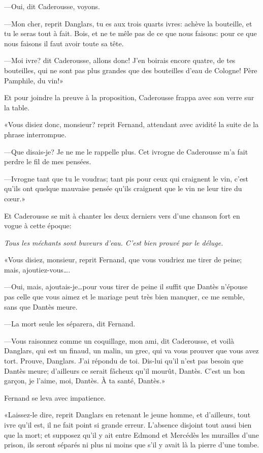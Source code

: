 —Oui, dit Caderousse, voyons.

—Mon cher, reprit Danglars, tu es aux trois quarts ivres: achève la bouteille, et tu le seras tout à fait. Bois, et ne te mêle pas de ce que nous faisons: pour ce que nous faisons il faut avoir toute sa tête.

—Moi ivre? dit Caderousse, allons donc! J'en boirais encore quatre, de tes bouteilles, qui ne sont pas plus grandes que des bouteilles d'eau de Cologne! Père Pamphile, du vin!»

Et pour joindre la preuve à la proposition, Caderousse frappa avec son verre sur la table.

«Vous disiez donc, monsieur? reprit Fernand, attendant avec avidité la suite de la phrase interrompue.

—Que disais-je? Je ne me le rappelle plus. Cet ivrogne de Caderousse m'a fait perdre le fil de mes pensées.

—Ivrogne tant que tu le voudras; tant pis pour ceux qui craignent le vin, c'est qu'ils ont quelque mauvaise pensée qu'ils craignent que le vin ne leur tire du cœur.»

Et Caderousse se mit à chanter les deux derniers vers d'une chanson fort en vogue à cette époque:

\textit{Tous les méchants sont buveurs d'eau. C'est bien prouvé par le déluge.}

«Vous disiez, monsieur, reprit Fernand, que vous voudriez me tirer de peine; mais, ajoutiez-vous\dots.

—Oui, mais, ajoutais-je\dots pour vous tirer de peine il suffit que Dantès n'épouse pas celle que vous aimez et le mariage peut très bien manquer, ce me semble, sans que Dantès meure.

—La mort seule les séparera, dit Fernand.

—Vous raisonnez comme un coquillage, mon ami, dit Caderousse, et voilà Danglars, qui est un finaud, un malin, un grec, qui va vous prouver que vous avez tort. Prouve, Danglars. J'ai répondu de toi. Dis-lui qu'il n'est pas besoin que Dantès meure; d'ailleurs ce serait fâcheux qu'il mourût, Dantès. C'est un bon garçon, je l'aime, moi, Dantès. À ta santé, Dantès.»

Fernand se leva avec impatience.

«Laissez-le dire, reprit Danglars en retenant le jeune homme, et d'ailleurs, tout ivre qu'il est, il ne fait point si grande erreur. L'absence disjoint tout aussi bien que la mort; et supposez qu'il y ait entre Edmond et Mercédès les murailles d'une prison, ils seront séparés ni plus ni moins que s'il y avait là la pierre d'une tombe.

